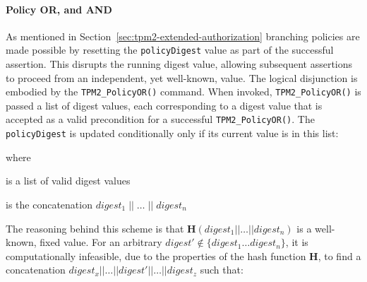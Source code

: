 \documentclass{sig-alternate-2013}
\begin{document}

\paragraph{Policy OR, and AND}
\label{sec:policy-or}

As mentioned in Section~\ref{sec:tpm2-extended-authorization} branching policies
are made possible by resetting the \texttt{policyDigest} value as part of the
successful assertion. This disrupts the running digest value, allowing
subsequent assertions to proceed from an independent, yet well-known, value. The
logical disjunction is embodied by the \texttt{TPM2\_PolicyOR()} command. When
invoked, \texttt{TPM2\_PolicyOR()} is passed a list of digest values, each
corresponding to a digest value that is accepted as a valid precondition for a
successful \texttt{TPM2\_PolicyOR()}. The \texttt{policyDigest} is updated
conditionally only if its current value is in this list:

\vspace{.5\baselineskip}
\noindent
{}

\vspace{.5\baselineskip}
\noindent where

\begin{description}
  \small
  \item[$digest_{1} \ldots digest_{n}$] \hfill is a list of valid digest values\footnotemark
  \item[$digests$] \hfill is the concatenation $digest_{1}\;||\;\ldots\;||\;digest_{n}$
\end{description}


The reasoning behind this scheme is that
$\mathbf{H}(digest_{1}||\ldots||digest_{n})$ is a well-known, fixed value. For
an arbitrary $digest' \notin \{digest_{1} \ldots digest_{n}\}$, it is
computationally infeasible, due to the properties of the hash function
$\mathbf{H}$, to find a concatenation
$digest_{x}||\ldots||digest'||\ldots||digest_{z}$ such that:
\end{document}

